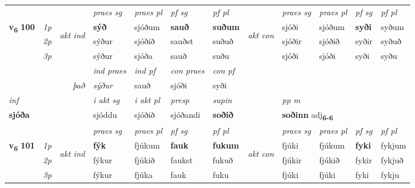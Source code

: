 \begin{longtable}[l]{X>{\footnotesize\itshape}llXXXXlXXXX}
 & &   & \textit{praes sg}  & \textit{praes pl}    & \textit{ pf sg} & \textit{pf pl} & & \textit{praes sg}  & \textit{praes pl}    & \textit{pf sg} & \textit{pf pl }  \\ \cmidrule{4-7} \cmidrule{9-12}
 \multirow{2}{*}{{{\textbf{v{\textsubscript{6}}} \Large{\textbf{100}}}}}  & 1p & \multirow{3}{*}{\begin{turn}{90}\textit{akt ind}\end{turn}} & \textbf{sýð} & sjóðum & \textbf{sauð} & \textbf{suðum} & \multirow{3}{*}{\begin{turn}{90}\textit{akt con}\end{turn}} &sjóði & sjóðum & \textbf{syði} & syðum\\*
 & 2p &  &  sýður  & sjóðið & sauðst & suðuð & & sjóðir & sjóðið & syðir & syðuð \\*
 & 3p &  & sýður & sjóða & sauð & suðu & & sjóði & sjóði& syði & syðu \\*
\cmidrule{4-7} \cmidrule{9-12}

   && &  \textit{ind praes} & \textit{ind pf} & \textit{con praes} & \textit{con pf} \\*
\multicolumn{3}{r}{\textit{það}} & sýður & sauð & sjóði & syði \\*

\cmidrule{4-7}
   {\textit{inf}} & &  & \textit{i akt sg} & \textit{i akt pl}   & \textit{presp} & \textit{supin}  && \textit{pp m} \\*
  {\textbf{sjóða}} & && sjóddu  & sjóðið   & sjóðandi &  \textbf{soðið}  && \multicolumn{2}{l}{\textbf{soðinn} adj\textbf{\textsubscript{6-6}}} \\*

\midrule

 & &   & \textit{praes sg}  & \textit{praes pl}    & \textit{ pf sg} & \textit{pf pl} & & \textit{praes sg}  & \textit{praes pl}    & \textit{pf sg} & \textit{pf pl }  \\ \cmidrule{4-7} \cmidrule{9-12}
 \multirow{2}{*}{{{\textbf{v{\textsubscript{6}}} \Large{\textbf{101}}}}}  & 1p & \multirow{3}{*}{\begin{turn}{90}\textit{akt ind}\end{turn}} & \textbf{fýk} & fjúkum & \textbf{fauk} & \textbf{fukum} & \multirow{3}{*}{\begin{turn}{90}\textit{akt con}\end{turn}} &fjúki & fjúkum & \textbf{fyki} & fykjum\\*
 & 2p &  &  fýkur  & fjúkið & faukst & fukuð & & fjúkir & fjúkið & fykir & fykjuð \\*
 & 3p &  & fýkur & fjúka & fauk & fuku & & fjúki & fjúki& fyki & fykju \\*
\cmidrule{4-7} \cmidrule{9-12}


\end{longtable}

